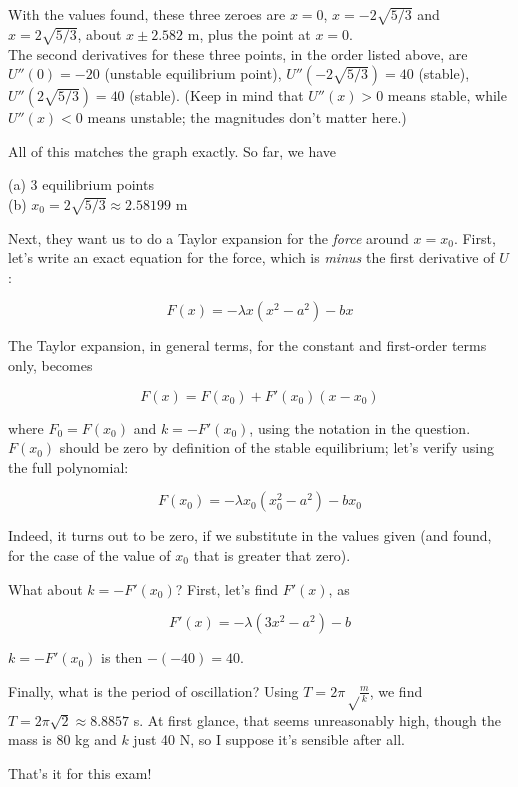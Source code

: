 \documentclass[8.01x]{subfiles}
\begin{document}
With the values found, these three zeroes are $x = 0$, $x = -2 \sqrt{5/3}$ and $x = 2 \sqrt{5/3}$, about $x \pm 2.582$ m, plus the point at $x = 0$.\\
The second derivatives for these three points, in the order listed above, are $U''(0) = -20$ (unstable equilibrium point), $U''(-2\sqrt{5/3}) = 40$ (stable), $U''(2 \sqrt{5/3}) = 40$ (stable). (Keep in mind that $U''(x) > 0$ means stable, while $U''(x) < 0$ means unstable; the magnitudes don't matter here.)

All of this matches the graph exactly. So far, we have

(a) 3 equilibrium points\\
(b) $x_0 = 2 \sqrt{5/3} \approx 2.58199$ m

Next, they want us to do a Taylor expansion for the \emph{force} around $x = x_0$. First, let's write an exact equation for the force, which is \emph{minus} the first derivative of $U$:

\begin{equation}
F(x) = - \lambda x (x^2 - a^2) - b x
\end{equation}

The Taylor expansion, in general terms, for the constant and first-order terms only, becomes

\begin{equation}
F(x) = F(x_0) + F'(x_0) (x - x_0)
\end{equation}

where $F_0 = F(x_0)$ and $k = -F'(x_0)$, using the notation in the question. $F(x_0)$ should be zero by definition of the stable equilibrium; let's verify using the full polynomial:

\begin{equation}
F(x_0) = - \lambda x_0 (x_0^2 - a^2) - b x_0
\end{equation}

Indeed, it turns out to be zero, if we substitute in the values given (and found, for the case of the value of $x_0$ that is greater that zero).

What about $k = -F'(x_0)$? First, let's find $F'(x)$, as

\begin{equation}
F'(x) = - \lambda (3x^2 - a^2) - b
\end{equation}

$k = -F'(x_0)$ is then $-(-40) = 40$.

Finally, what is the period of oscillation? Using $\displaystyle T = 2 \pi \sqrt\frac{m}{k}$, we find $T = 2 \pi \sqrt{2} \approx 8.8857$ s. At first glance, that seems unreasonably high, though the mass is 80 kg and $k$ just 40 N, so I suppose it's sensible after all.

That's it for this exam!
\end{document}
